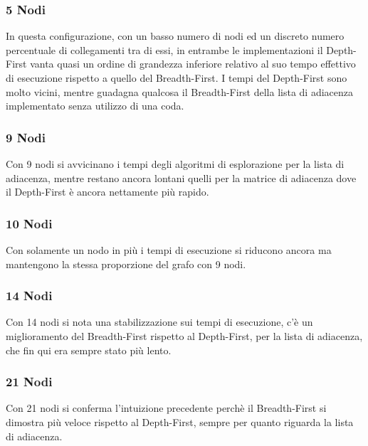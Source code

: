 \documentclass{article}
\begin{document}
\subsubsection{5 Nodi}
In questa configurazione, con un basso numero di nodi ed un discreto numero percentuale di collegamenti tra di essi, in entrambe le implementazioni il Depth-First vanta quasi un ordine di grandezza inferiore relativo al suo tempo effettivo di esecuzione rispetto a quello del Breadth-First. \newline
I tempi del Depth-First sono molto vicini, mentre guadagna qualcosa il Breadth-First della lista di adiacenza implementato senza utilizzo di una coda.

\subsubsection{9 Nodi}
Con 9 nodi si avvicinano i tempi degli algoritmi di esplorazione per la lista di adiacenza, mentre restano ancora lontani quelli per la matrice di adiacenza dove il Depth-First \`e ancora nettamente pi\`u rapido.

\subsubsection{10 Nodi}
Con solamente un nodo in pi\`u i tempi di esecuzione si riducono ancora ma mantengono la stessa proporzione del grafo con 9 nodi.

\subsubsection{14 Nodi}
Con 14 nodi si nota una stabilizzazione sui tempi di esecuzione, c'\`e un miglioramento del Breadth-First rispetto al Depth-First, per la lista di adiacenza, che fin qui era sempre stato pi\`u lento.

\subsubsection{21 Nodi}
Con 21 nodi si conferma l'intuizione precedente perch\`e il Breadth-First si dimostra pi\`u veloce rispetto al Depth-First, sempre per quanto riguarda la lista di adiacenza.

\end{document}
